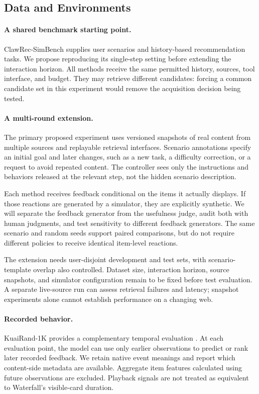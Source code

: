\documentclass[11pt]{article}
\begin{document}
\subsection{Data and Environments}

\paragraph{A shared benchmark starting point.}
ClawRec-SimBench \citep{wu2026clawrec} supplies user scenarios and history-based recommendation tasks. We propose reproducing its single-step setting before extending the interaction horizon. All methods receive the same permitted history, sources, tool interface, and budget. They may retrieve different candidates: forcing a common candidate set in this experiment would remove the acquisition decision being tested.

\paragraph{A multi-round extension.}
The primary proposed experiment uses versioned snapshots of real content from multiple sources and replayable retrieval interfaces. Scenario annotations specify an initial goal and later changes, such as a new task, a difficulty correction, or a request to avoid repeated content. The controller sees only the instructions and behaviors released at the relevant step, not the hidden scenario description.

Each method receives feedback conditional on the items it actually displays. If those reactions are generated by a simulator, they are explicitly synthetic. We will separate the feedback generator from the usefulness judge, audit both with human judgments, and test sensitivity to different feedback generators. The same scenario and random seeds support paired comparisons, but do not require different policies to receive identical item-level reactions.

The extension needs user-disjoint development and test sets, with scenario-template overlap also controlled. Dataset size, interaction horizon, source snapshots, and simulator configuration remain to be fixed before test evaluation. A separate live-source run can assess retrieval failures and latency; snapshot experiments alone cannot establish performance on a changing web.

\paragraph{Recorded behavior.}
KuaiRand-1K provides a complementary temporal evaluation \citep{gao2022kuairand}. At each evaluation point, the model can use only earlier observations to predict or rank later recorded feedback. We retain native event meanings and report which content-side metadata are available. Aggregate item features calculated using future observations are excluded. Playback signals are not treated as equivalent to Waterfall's visible-card duration.
\end{document}
